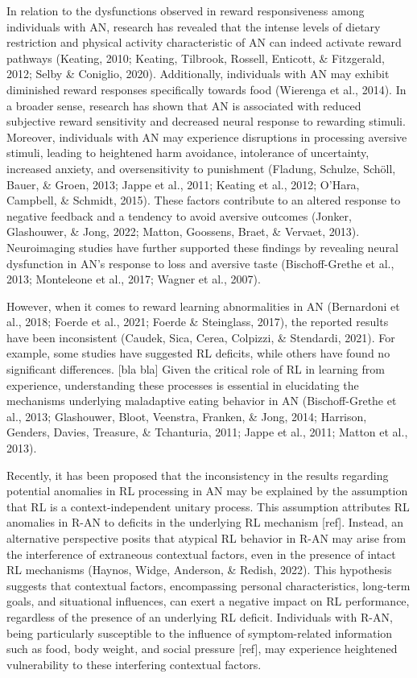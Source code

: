 \documentclass[
  man,floatsintext]{apa6}
\begin{document}
In relation to the dysfunctions observed in reward responsiveness among individuals with AN, research has revealed that the intense levels of dietary restriction and physical activity characteristic of AN can indeed activate reward pathways (Keating, 2010; Keating, Tilbrook, Rossell, Enticott, \& Fitzgerald, 2012; Selby \& Coniglio, 2020). Additionally, individuals with AN may exhibit diminished reward responses specifically towards food (Wierenga et al., 2014). In a broader sense, research has shown that AN is associated with reduced subjective reward sensitivity and decreased neural response to rewarding stimuli. Moreover, individuals with AN may experience disruptions in processing aversive stimuli, leading to heightened harm avoidance, intolerance of uncertainty, increased anxiety, and oversensitivity to punishment (Fladung, Schulze, Schöll, Bauer, \& Groen, 2013; Jappe et al., 2011; Keating et al., 2012; O'Hara, Campbell, \& Schmidt, 2015). These factors contribute to an altered response to negative feedback and a tendency to avoid aversive outcomes (Jonker, Glashouwer, \& Jong, 2022; Matton, Goossens, Braet, \& Vervaet, 2013). Neuroimaging studies have further supported these findings by revealing neural dysfunction in AN's response to loss and aversive taste (Bischoff-Grethe et al., 2013; Monteleone et al., 2017; Wagner et al., 2007).

However, when it comes to reward learning abnormalities in AN (Bernardoni et al., 2018; Foerde et al., 2021; Foerde \& Steinglass, 2017), the reported results have been inconsistent (Caudek, Sica, Cerea, Colpizzi, \& Stendardi, 2021). For example, some studies have suggested RL deficits, while others have found no significant differences. {[}bla bla{]} Given the critical role of RL in learning from experience, understanding these processes is essential in elucidating the mechanisms underlying maladaptive eating behavior in AN (Bischoff-Grethe et al., 2013; Glashouwer, Bloot, Veenstra, Franken, \& Jong, 2014; Harrison, Genders, Davies, Treasure, \& Tchanturia, 2011; Jappe et al., 2011; Matton et al., 2013).

Recently, it has been proposed that the inconsistency in the results regarding potential anomalies in RL processing in AN may be explained by the assumption that RL is a context-independent unitary process. This assumption attributes RL anomalies in R-AN to deficits in the underlying RL mechanism {[}ref{]}. Instead, an alternative perspective posits that atypical RL behavior in R-AN may arise from the interference of extraneous contextual factors, even in the presence of intact RL mechanisms (Haynos, Widge, Anderson, \& Redish, 2022). This hypothesis suggests that contextual factors, encompassing personal characteristics, long-term goals, and situational influences, can exert a negative impact on RL performance, regardless of the presence of an underlying RL deficit. Individuals with R-AN, being particularly susceptible to the influence of symptom-related information such as food, body weight, and social pressure {[}ref{]}, may experience heightened vulnerability to these interfering contextual factors.
\end{document}
